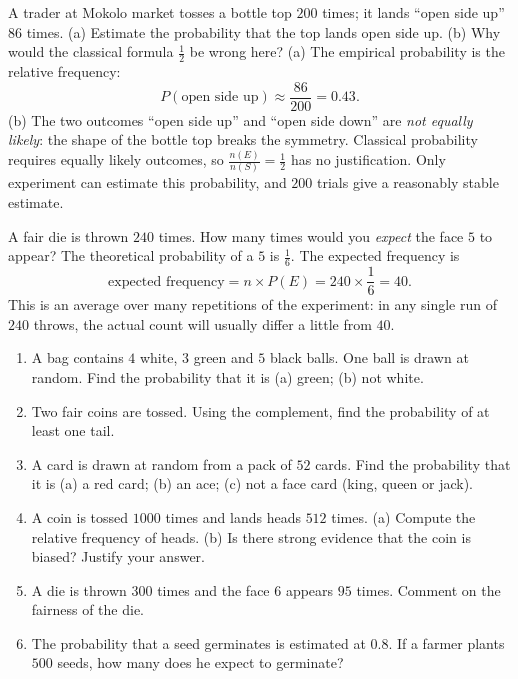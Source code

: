 \documentclass[11pt]{article}
\newcommand{\cle}[1]{{\popxbold\color{popdark}#1}}
\begin{document}
\begin{exoresolu}
A trader at Mokolo market tosses a bottle top $200$ times; it lands ``open side up'' $86$ times. (a) Estimate the probability that the top lands open side up. (b) Why would the classical formula $\frac{1}{2}$ be wrong here?
\tcblower
(a) The empirical probability is the relative frequency:
\[
P(\text{open side up}) \approx \frac{86}{200} = 0.43.
\]
(b) The two outcomes ``open side up'' and ``open side down'' are \emph{not equally likely}: the shape of the bottle top breaks the symmetry. Classical probability requires equally likely outcomes, so $\frac{n(E)}{n(S)} = \frac{1}{2}$ has no justification. Only experiment can estimate this probability, and $200$ trials give a reasonably stable estimate.
\end{exoresolu}

\begin{exoresolu}
A fair die is thrown $240$ times. How many times would you \emph{expect} the face $5$ to appear?
\tcblower
The theoretical probability of a $5$ is $\frac{1}{6}$. The \cle{expected frequency} is
\[
\text{expected frequency} = n \times P(E) = 240 \times \frac{1}{6} = 40.
\]
This is an average over many repetitions of the experiment: in any single run of $240$ throws, the actual count will usually differ a little from $40$.
\end{exoresolu}

\begin{exercice}[]
\begin{enumerate}
\item A bag contains $4$ white, $3$ green and $5$ black balls. One ball is drawn at random. Find the probability that it is (a) green; (b) not white.
\item Two fair coins are tossed. Using the complement, find the probability of at least one tail.
\item A card is drawn at random from a pack of $52$ cards. Find the probability that it is (a) a red card; (b) an ace; (c) not a face card (king, queen or jack).
\item A coin is tossed $1000$ times and lands heads $512$ times. (a) Compute the relative frequency of heads. (b) Is there strong evidence that the coin is biased? Justify your answer.
\item A die is thrown $300$ times and the face $6$ appears $95$ times. Comment on the fairness of the die.
\item The probability that a seed germinates is estimated at $0.8$. If a farmer plants $500$ seeds, how many does he expect to germinate?
\end{enumerate}
\end{exercice}
\end{document}
